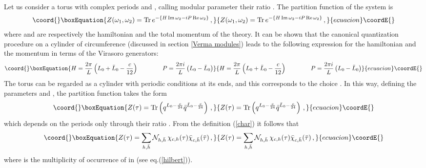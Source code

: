 \documentclass[a4paper,12pt]{report}
\begin{document}
Let us consider a torus with complex periods \coordHE{} and \coordHE{}, calling modular parameter their ratio
\coordHE{}. The partition function of the system is
\begin{equation}\coord{}\boxEquation{
Z(\omega_{1},\omega_{2})=\textrm{Tr}\,e^{-\{H\,\footnotesize\textrm{Im}\normalsize\,\omega_{2}-iP\,\footnotesize\textrm{Re}\normalsize\,\omega_{2}\}}\,
,
}{
Z(\omega_{1},\omega_{2})=\textrm{Tr}\,e^{-\{H\,\footnotesize\textrm{Im}\normalsize\,\omega_{2}-iP\,\footnotesize\textrm{Re}\normalsize\,\omega_{2}\}}\,
,
}{ecuacion}\coordE{}\end{equation}
where \coordHE{} and \coordHE{} are respectively the hamiltonian and the total momentum of the theory. It can be shown that the
canonical quantization procedure on a cylinder of circumference \coordHE{} (discussed in section \ref{Verma modules})
leads to the following expression for the hamiltonian and the momentum in terms of the Virasoro generators:
\begin{equation}\coord{}\boxEquation{\label{hamcyl}
H=\frac{2\pi}{L}\left(L_{0}+\bar{L}_{0}-\frac{c}{12}\right) \qquad \qquad P=\frac{2\pi i
}{L}\left(L_{0}-\bar{L}_{0}\right)
}{H=\frac{2\pi}{L}\left(L_{0}+\bar{L}_{0}-\frac{c}{12}\right) \qquad \qquad P=\frac{2\pi i
}{L}\left(L_{0}-\bar{L}_{0}\right)
}{ecuacion}\coordE{}\end{equation}
The torus can be regarded as a cylinder with periodic conditions at its ends, and this corresponds to the choice
\coordHE{}. In this way, defining the parameters \coordHE{} and \coordHE{},
the partition function takes the form
\begin{equation}\coord{}\boxEquation{\label{partfct}
Z(\tau)=\textrm{Tr}\left(q^{L_{0}-\frac{c}{24}}\bar{q}^{\bar{L}_{0}-\frac{c}{24}}\right)\,,
}{Z(\tau)=\textrm{Tr}\left(q^{L_{0}-\frac{c}{24}}\bar{q}^{\bar{L}_{0}-\frac{c}{24}}\right)\,,
}{ecuacion}\coordE{}\end{equation}
which depends on the periods \coordHE{} only through their ratio \myHighlight{$\tau$}\coordHE{}. From the definition (\ref{char}) it
follows that
\begin{equation}\coord{}\boxEquation{
Z(\tau)=\sum_{h,\bar{h}}{\cal N}_{h,\bar{h}}\,\chi _{c,h }(\tau)\bar{\chi} _{c,\bar{h} }(\bar{\tau})\,,
}{
Z(\tau)=\sum_{h,\bar{h}}{\cal N}_{h,\bar{h}}\,\chi _{c,h }(\tau)\bar{\chi} _{c,\bar{h} }(\bar{\tau})\,,
}{ecuacion}\coordE{}\end{equation}
where \coordHE{} is the multiplicity of occurrence of \coordHE{} in \coordHE{} (see eq.(\ref{hilbert})).
\end{document}
